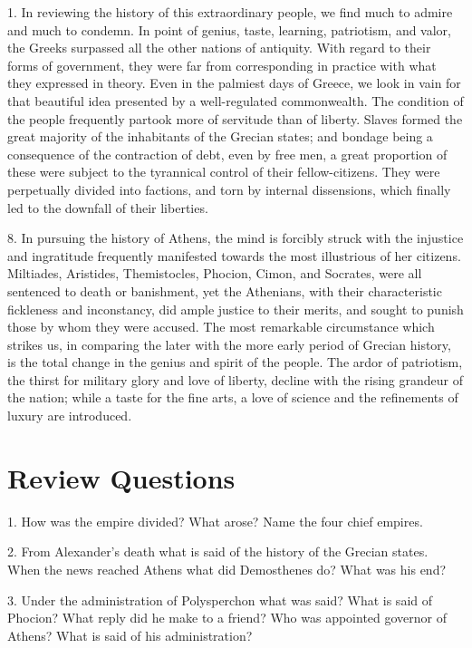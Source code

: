 \documentclass[openany,a4paper]{memoir}
\begin{document}
1. In reviewing the history of this extraordinary people, 
we find much to admire and much to condemn. In point of 
genius, taste, learning, patriotism, and valor, the Greeks surpassed all the other nations of antiquity. With regard to 
their forms of government, they were far from corresponding 
in practice with what they expressed in theory. Even in 
the palmiest days of Greece, we look in vain for that beautiful idea presented by a well-regulated commonwealth. The 
condition of the people frequently partook more of servitude 
than of liberty. Slaves formed the great majority of the 
inhabitants of the Grecian states; and bondage being a consequence of the contraction of debt, even by free men, a 
great proportion of these were subject to the tyrannical control of their fellow-citizens. They were perpetually divided 
into factions, and torn by internal dissensions, which finally 
led to the downfall of their liberties. 

8. In pursuing the history of Athens, the mind is forcibly 
struck with the injustice and ingratitude frequently manifested towards the most illustrious of her citizens. Miltiades, Aristides, Themistocles, Phocion, Cimon, and Socrates, 
were all sentenced to death or banishment, yet the Athenians, 
with their characteristic fickleness and inconstancy, did ample justice to their merits, and sought to punish those by 
whom they were accused. The most remarkable circumstance 
which strikes us, in comparing the later with the more early 
period of Grecian history, is the total change in the genius 
and spirit of the people. The ardor of patriotism, the thirst 
for military glory and love of liberty, decline with the rising 
grandeur of the nation; while a taste for the fine arts, a love 
of science and the refinements of luxury are introduced. 


\section{Review Questions}

1. How was the empire divided? What arose? Name 
the four chief empires.

2. From Alexander's death what is said of the 
history of the Grecian states. When the news reached Athens what 
did Demosthenes do? What was his end? 

3. Under the administration of Polysperchon what was said? What 
is said of Phocion? What reply did he make to a friend? Who was 
appointed governor of Athens? What is said of his administration?
\end{document}
